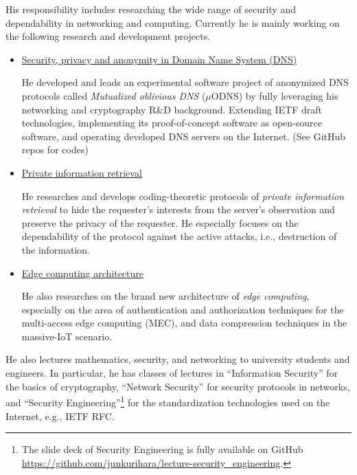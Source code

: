 \hspace*{4ex} His responsibility includes researching the wide range of security and dependability in networking and computing.
Currently he is mainly working on the following research and development projects.
\begin{itemize}
\item \hspace*{4ex} \underline{Security, privacy and anonymity in Domain Name System (DNS)}\\[0.5ex]
\hspace*{6ex}\begin{minipage}{0.9\linewidth}
He developed and leads an experimental software project of anonymized DNS protocols called \textit{Mutualized oblivious DNS} ($\mu$ODNS) by fully leveraging his networking and cryptography R\&D background. Extending IETF draft technologies, implementing its proof-of-concept software as open-source software, and operating developed DNS servers on the Internet. (See GitHub repos for codes)
\end{minipage}
\item \hspace*{4ex} \underline{Private information retrieval}\\[0.5ex]
\hspace*{6ex}\begin{minipage}{0.9\linewidth}
He researches and develops coding-theoretic protocols of \emph{private information retrieval} to hide the requester's interests from the server's observation and preserve the privacy of the requester. He especially focuses on the dependability of the protocol against the active attacks, i.e., destruction of the information.
\end{minipage}
\item \hspace*{4ex} \underline{Edge computing architecture}\\[0.5ex]
\hspace*{6ex}\begin{minipage}{0.9\linewidth}
He also researches on the brand new architecture of \emph{edge computing}, especially on the area of authentication and authorization techniques for the multi-access edge computing (MEC), and data compression techniques in the massive-IoT scenario.
\end{minipage}
\end{itemize}
He also lectures mathematics, security, and networking to university students and engineers.
In particular, he has classes of lectures in ``Information Security'' for the basics of cryptography, ``Network Security'' for security protocols in networks, and ``Security Engineering''\footnote{The slide deck of Security Engineering is fully available on GitHub \url{https://github.com/junkurihara/lecture-security_engineering}.} for the standardization technologies used on the Internet, e.g., IETF RFC.
\vspace*{2ex}

